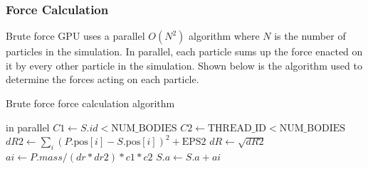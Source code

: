 \documentclass{thesis}
\begin{document}
\subsubsection{Force Calculation}
Brute force GPU uses a parallel $O(N^2)$ algorithm where $N$ is the number of particles in the simulation. In parallel, each particle sums up the force enacted on it by every other particle in the simulation. Shown below is the algorithm used to determine the forces acting on each particle.
\begin{algorithm}
    \label{alg:ForceCalculationExact}
    \caption{Brute force force calculation algorithm}
    \begin{algorithmic}
         in parallel
                \State $C1 \gets S.id < \text{NUM\_BODIES}$
                \State $C2 \gets \text{THREAD\_ID} < \text{NUM\_BODIES}$
                \State $dR2 \gets \sum_i (P.\text{pos}[i] - S.\text{pos}[i])^2 + \text{EPS2}$
                \State $dR \gets \sqrt{dR2}$
                \State $ai \gets P.mass/(dr*dr2) * c1 * c2$
                \State $S.a \gets S.a + ai$ 
            \EndFor
        \EndFor
    \end{algorithmic}
\end{algorithm}
\end{document}
